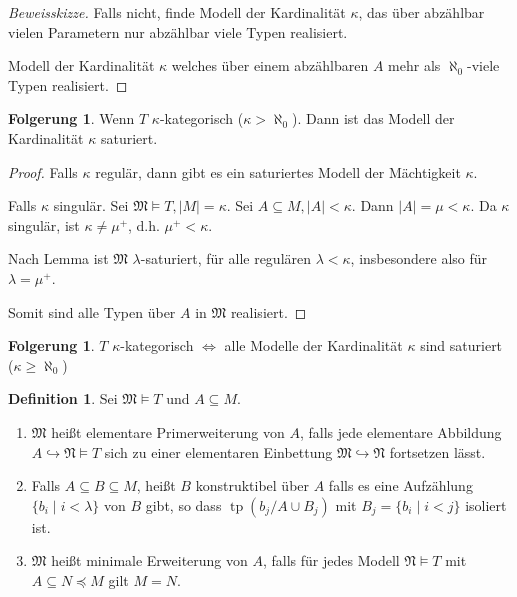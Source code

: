 \documentclass[12pt,parskip=full]{scrartcl}
\newcommand{\abs}[1]{{\left| #1 \right|}}
\theoremstyle{definition}
\newtheorem{corollary}[theorem]{Folgerung}
\newtheorem{definition}[theorem]{Definition}
\begin{document}
 	\begin{proof}[Beweisskizze]
 		Falls nicht, finde Modell der Kardinalität $\kappa$, das über abzählbar vielen Parametern nur abzählbar viele Typen realisiert.
 		
 		Modell der Kardinalität $\kappa$ welches über einem abzählbaren $A$ mehr als $\aleph_0$-viele Typen realisiert.
 	\end{proof}
 
 	\begin{corollary}
 		Wenn $T$ $\kappa$-kategorisch ($\kappa > \aleph_0$). Dann ist das Modell der Kardinalität $\kappa$ saturiert.
 	\end{corollary}
 
 	\begin{proof}
 		Falls $\kappa$ regulär, dann gibt es ein saturiertes Modell der Mächtigkeit $\kappa$.
 		
 		Falls $\kappa$ singulär. Sei $\mathfrak{M} \models T, \abs{M} = \kappa$. Sei $A \subseteq M, \abs{A} < \kappa$. Dann $\abs{A} = \mu < \kappa$. Da $\kappa$ singulär, ist $\kappa \neq \mu^+$, d.h. $\mu^+ < \kappa$.
 		
 		Nach Lemma ist $\mathfrak{M}$ $\lambda$-saturiert, für alle regulären $\lambda < \kappa$, insbesondere also für $\lambda = \mu^+$.
 		
 		Somit sind alle Typen über $A$ in $\mathfrak{M}$ realisiert.
 	\end{proof}
 
 	\begin{corollary}
 		$T$ $\kappa$-kategorisch $\Leftrightarrow$ alle Modelle der Kardinalität $\kappa$ sind saturiert ($\kappa \geq \aleph_0$)
 	\end{corollary}
 
 	\begin{definition}
 		Sei $\mathfrak{M} \models T$ und $A \subseteq M$.
 		\begin{enumerate}
 			\item $\mathfrak{M}$ heißt elementare Primerweiterung von $A$, falls jede elementare Abbildung $A \hookrightarrow \mathfrak{N} \models T$ sich zu einer elementaren Einbettung $\mathfrak{M} \hookrightarrow \mathfrak{N}$ fortsetzen lässt.
 			\item Falls $A \subseteq B \subseteq M$, heißt $B$ konstruktibel über $A$ falls es eine Aufzählung $\{ b_i \mid i < \lambda \}$ von $B$ gibt, so dass $\operatorname{tp}(b_{j}/A \cup B_j)$ mit $B_j = \{ b_i \mid i < j \}$ isoliert ist.
 			\item $\mathfrak{M}$ heißt minimale Erweiterung von $A$, falls für jedes Modell $\mathfrak{N} \models T$ mit $A \subseteq N \preccurlyeq M$ gilt $M = N$.
 		\end{enumerate}
 	\end{definition}
 
\end{document}
